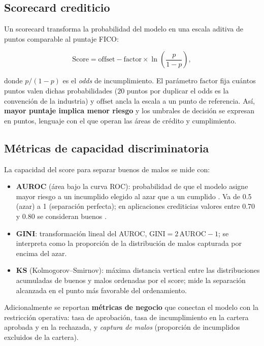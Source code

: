 \documentclass[11pt,letterpaper]{article}
\begin{document}
\subsection{Scorecard crediticio}

Un scorecard transforma la probabilidad del modelo en una escala aditiva de
puntos comparable al puntaje FICO:

\begin{equation}
  \text{Score} = \text{offset} - \text{factor} \times \ln\!\left(\frac{p}{1-p}\right),
  \label{eq:score}
\end{equation}

donde $p/(1-p)$ es el \emph{odds} de incumplimiento. El parámetro
$\text{factor}$ fija cuántos puntos valen dichas probabilidades ($20$ puntos
por duplicar el odds es la convención de la industria) y $\text{offset}$ ancla
la escala a un punto de referencia. Así, \textbf{mayor puntaje implica menor
riesgo} y los umbrales de decisión se expresan en puntos, lenguaje con el que
operan las áreas de crédito y cumplimiento.

\subsection{Métricas de capacidad discriminatoria}

La capacidad del score para separar buenos de malos se mide con:

\begin{itemize}[leftmargin=1.6em]
  \item \textbf{AUROC} (área bajo la curva ROC): probabilidad de que el modelo
        asigne mayor riesgo a un incumplido elegido al azar que a un
        cumplido \cite{hanley1982}. Va de 0.5 (azar) a 1 (separación perfecta);
        en aplicaciones crediticias valores entre 0.70 y 0.80 se consideran
        buenos \cite{siddiqi2006}.
  \item \textbf{GINI}: transformación lineal del AUROC, $\text{GINI} =
        2\,\text{AUROC} - 1$; se interpreta como la proporción de la
        distribución de malos capturada por encima del azar.
  \item \textbf{KS} (Kolmogorov--Smirnov): máxima distancia vertical entre las
        distribuciones acumuladas de buenos y malos ordenadas por el score;
        mide la separación alcanzada en el punto más favorable del ordenamiento.
\end{itemize}

Adicionalmente se reportan \textbf{métricas de negocio} que conectan el modelo
con la restricción operativa: tasa de aprobación, tasa de incumplimiento en la
cartera aprobada y en la rechazada, y \emph{captura de malos} (proporción de
incumplidos excluidos de la cartera).
\end{document}
